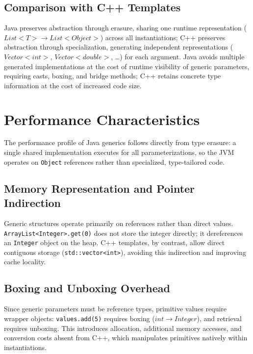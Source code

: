 \documentclass[11pt]{report}
\begin{document}
\subsection{Comparison with C++ Templates}

Java preserves abstraction through erasure, sharing one runtime
representation ($List{<}T{>} \rightarrow List{<}Object{>}$) across all
instantiations; C++ preserves abstraction through specialization, generating
independent representations ($Vector{<}int{>}$, $Vector{<}double{>}$, \dots)
for each argument. Java avoids multiple generated implementations at the
cost of runtime visibility of generic parameters, requiring casts, boxing,
and bridge methods; C++ retains concrete type information at the cost of
increased code size.


\section{Performance Characteristics}
\label{JavaGenerics:Performance}

The performance profile of Java generics follows directly from type
erasure: a single shared implementation executes for all parameterizations,
so the JVM operates on \texttt{Object} references rather than
specialized, type-tailored code.

\subsection{Memory Representation and Pointer Indirection}

Generic structures operate primarily on references rather than direct
values. \texttt{ArrayList<Integer>.}\allowbreak\texttt{get(0)} does not store the integer
directly; it dereferences an \texttt{Integer} object on the heap. C++
templates, by contrast, allow direct contiguous storage
(\texttt{std::vector<int>}), avoiding this indirection and improving cache
locality.

\subsection{Boxing and Unboxing Overhead}

Since generic parameters must be reference types, primitive values require
wrapper objects: \texttt{values.add(5)} requires boxing
($int \rightarrow Integer$), and retrieval requires unboxing. This
introduces allocation, additional memory accesses, and conversion costs
absent from C++, which manipulates primitives natively within
instantiations.
\end{document}
